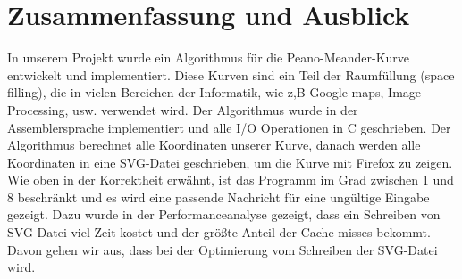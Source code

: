 \documentclass[course=erap]{aspdoc}
\begin{document}
\section{Zusammenfassung und Ausblick}
In unserem Projekt wurde ein Algorithmus für die Peano-Meander-Kurve entwickelt und implementiert.
Diese Kurven sind ein Teil der Raumfüllung (space filling), die in vielen Bereichen der Informatik, wie z,B Google maps, Image Processing, usw. verwendet wird.\newline
Der Algorithmus wurde in der Assemblersprache implementiert und alle I/O Operationen in C geschrieben. Der Algorithmus berechnet alle Koordinaten unserer Kurve, danach werden alle Koordinaten in eine SVG-Datei geschrieben, um die Kurve mit Firefox zu zeigen. Wie oben in der Korrektheit erwähnt, ist das Programm im Grad zwischen 1 und 8 beschränkt und es wird eine passende Nachricht für eine ungültige Eingabe gezeigt.\newline
Dazu wurde in der Performanceanalyse gezeigt, dass ein Schreiben von SVG-Datei viel Zeit kostet und der größte Anteil der Cache-misses bekommt. Davon gehen wir aus, dass bei der Optimierung vom Schreiben der SVG-Datei wird.


{}
\end{document}
